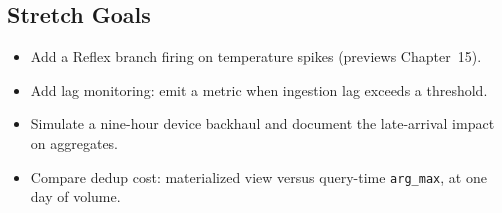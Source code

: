 \subsection*{Stretch Goals}
\begin{itemize}
    \item Add a Reflex branch firing on temperature spikes (previews Chapter~15).
    \item Add lag monitoring: emit a metric when ingestion lag exceeds a threshold.
    \item Simulate a nine-hour device backhaul and document the late-arrival impact on aggregates.
    \item Compare dedup cost: materialized view versus query-time \texttt{arg\_max}, at one day of volume.
\end{itemize}
